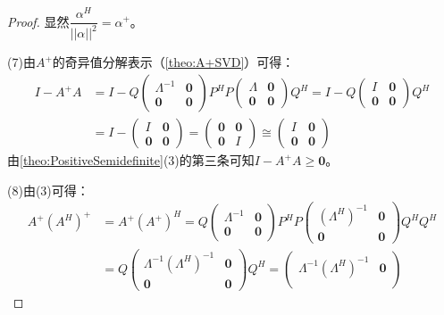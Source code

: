 \begin{proof}
	显然$\dfrac{\alpha^H}{||\alpha||^2}=\alpha^+$。\par
	(7)由$A^+$的奇异值分解表示（\cref{theo:A+SVD}）可得：
	\begin{align*}
		I-A^+A&=I-Q
		\begin{pmatrix}
			\varLambda^{-1} & \mathbf{0} \\
			\mathbf{0} & \mathbf{0}
		\end{pmatrix}
		P^HP
		\begin{pmatrix}
			\varLambda & \mathbf{0} \\
			\mathbf{0} & \mathbf{0}
		\end{pmatrix}Q^H
		=I-Q
		\begin{pmatrix}
			I & \mathbf{0} \\
			\mathbf{0} & \mathbf{0}
		\end{pmatrix}Q^H \\
		&=I-\begin{pmatrix}
			I & \mathbf{0} \\
			\mathbf{0} & \mathbf{0}
		\end{pmatrix}
		=\begin{pmatrix}
			\mathbf{0} & \mathbf{0} \\
			\mathbf{0} & I
		\end{pmatrix}\cong
		\begin{pmatrix}
			I & \mathbf{0} \\
			\mathbf{0} & \mathbf{0}
		\end{pmatrix}
	\end{align*}
	由\cref{theo:PositiveSemidefinite}(3)的第三条可知$I-A^+A\geqslant\mathbf{0}$。\par
	(8)由(3)可得：
	\begin{align*}
		A^+(A^H)^+&=A^+(A^+)^H=Q
		\begin{pmatrix}
			\varLambda^{-1} & \mathbf{0} \\
			\mathbf{0} & \mathbf{0}
		\end{pmatrix}
		P^HP
		\begin{pmatrix}
			(\varLambda^H)^{-1} & \mathbf{0} \\
			\mathbf{0} & \mathbf{0}
		\end{pmatrix}Q^HQ^H \\
		&=Q\begin{pmatrix}
			\varLambda^{-1}(\varLambda^H)^{-1} & \mathbf{0} \\
			\mathbf{0} & \mathbf{0}
		\end{pmatrix}Q^H
		=\begin{pmatrix}
			\varLambda^{-1}(\varLambda^{H})^{-1} & \mathbf{0} \\

\end{pmatrix}
\end{align*}
\end{proof}
